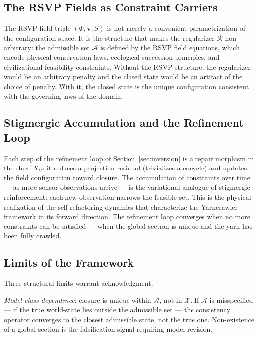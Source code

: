 \documentclass[12pt, oneside]{article}
\begin{document}
\subsection{The RSVP Fields as Constraint Carriers}

The RSVP field triple $(\Phi, \mathbf{v}, S)$ is not merely a convenient
parametrization of the configuration space. It is the structure that makes the regularizer
$\mathcal{R}$ non-arbitrary: the admissible set $\mathcal{A}$ is defined by the RSVP
field equations, which encode physical conservation laws, ecological succession
principles, and civilizational feasibility constraints. Without the RSVP structure, the
regularizer would be an arbitrary penalty and the closed state would be an artifact of
the choice of penalty. With it, the closed state is the unique configuration consistent
with the governing laws of the domain.

\subsection{Stigmergic Accumulation and the Refinement Loop}

Each step of the refinement loop of Section~\ref{sec:inversion} is a repair morphism in
the sheaf $\mathcal{S}_\Pi$: it reduces a projection residual (trivializes a cocycle) and
updates the field configuration toward closure. The accumulation of constraints over
time --- as more sensor observations arrive --- is the variational analogue of stigmergic
reinforcement: each new observation narrows the feasible set. This is the physical
realization of the self-refactoring dynamics that characterize the Yarncrawler framework
in its forward direction. The refinement loop converges when no more constraints can be
satisfied --- when the global section is unique and the yarn has been fully crawled.

\subsection{Limits of the Framework}

Three structural limits warrant acknowledgment.

\emph{Model class dependence}: closure is unique within $\mathcal{A}$, not in $\mathcal{X}$.
If $\mathcal{A}$ is misspecified --- if the true world-state lies outside the admissible
set --- the consistency operator converges to the closest admissible state, not the true
one. Non-existence of a global section is the falsification signal requiring model
revision.
\end{document}
